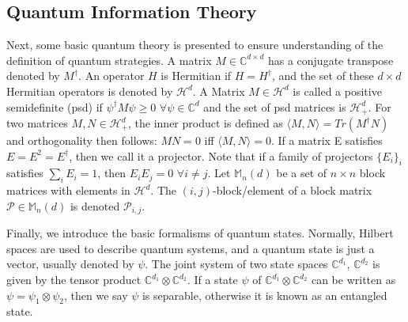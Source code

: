 \documentclass[12pt]{article}
\begin{document}
\subsection{Quantum Information Theory}
Next, some basic quantum theory is presented to ensure understanding of the definition of quantum strategies. A matrix $M \in \mathbb{C}^{d \times d}$ has a conjugate transpose denoted by $M^\dag$. An operator $H$ is Hermitian if $H = {H^{\dag}}$, and the set of these $d \times d$ Hermitian operators is denoted by $\mathcal{H}^d$. A Matrix $M \in \mathcal{H}^d$ is called a positive semidefinite (psd) if $\psi^\dag M \psi \geq 0$ $\forall \psi \in \mathbb{C}^d$ and the set of psd matrices is $\mathcal{H}^d_+$. For two matrices $M, N \in \mathcal{H}^d_+$, the inner product is defined as $\langle M, N\rangle = Tr(M^\dag N)$ and orthogonality then follows: $MN = 0$ iff $\langle M, N \rangle = 0$. If a matrix E satisfies $E = E^2 = E^\dag$, then we call it a projector. Note that if a family of projectors $\{E_i\}_i$ satisfies $\sum_iE_i = 1$, then $E_iE_j = 0$ $\forall i \neq j$. Let $\mathbb{M}_n(d)$ be a set of $n \times n$ block matrices with elements in $\mathcal{H}^d$. The $(i, j)$-block/element of a block matrix $\mathcal{P} \in \mathbb{M}_n(d)$ is denoted $\mathcal{P}_{i, j}$.

Finally, we introduce the basic formalisms of quantum states. Normally, Hilbert spaces are used to describe quantum systems, and a quantum state is just a vector, usually denoted by $\psi$. The joint system of two state spaces $\mathbb{C}^{d_1}$, $\mathbb{C}^{d_2}$ is given by the tensor product $\mathbb{C}^{d_1} \otimes \mathbb{C}^{d_2}$. If a state $\psi$ of $\mathbb{C}^{d_1} \otimes \mathbb{C}^{d_2}$ can be written as $\psi = \psi_1 \otimes \psi_2$, then we say $\psi$ is separable, otherwise it is known as an entangled state.
\end{document}
